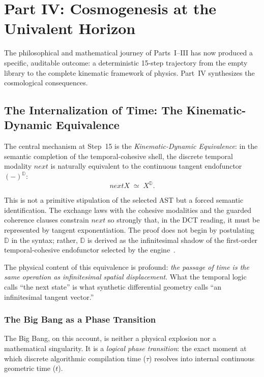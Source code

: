 \documentclass[11pt,a4paper]{article}
\def\bigcirc{next}%
\theoremstyle{plain}
\theoremstyle{definition}
\theoremstyle{remark}
\newcommand{\D}{\mathbb{D}}
\begin{document}
\section{Part IV: Cosmogenesis at the Univalent Horizon}
\label{sec:partIV}

The philosophical and mathematical journey of Parts~I--III has now produced a specific, auditable outcome: a deterministic 15-step trajectory from the empty library to the complete kinematic framework of physics.  Part~IV synthesizes the cosmological consequences.


\subsection{The Internalization of Time: The Kinematic-Dynamic Equivalence}
\label{sec:kde}

The central mechanism at Step~15 is the \emph{Kinematic-Dynamic Equivalence}: in the semantic completion of the temporal-cohesive shell, the discrete temporal modality $\bigcirc$ is naturally equivalent to the continuous tangent endofunctor $(-)^{\D}$:
\begin{equation}
\label{eq:kde}
\bigcirc X \;\simeq\; X^{\D}.
\end{equation}

This is not a primitive stipulation of the selected AST but a forced semantic identification.  The exchange laws with the cohesive modalities and the guarded coherence clauses constrain $\bigcirc$ so strongly that, in the DCT reading, it must be represented by tangent exponentiation.  The proof does not begin by postulating $\D$ in the syntax; rather, $\D$ is derived as the infinitesimal shadow of the first-order temporal-cohesive endofunctor selected by the engine~\cite{pen2026}.

The physical content of this equivalence is profound: \emph{the passage of time is the same operation as infinitesimal spatial displacement}.  What the temporal logic calls ``the next state'' is what synthetic differential geometry calls ``an infinitesimal tangent vector.''


\subsubsection{The Big Bang as a Phase Transition}

The Big Bang, on this account, is neither a physical explosion nor a mathematical singularity.  It is a \emph{logical phase transition}: the exact moment at which discrete algorithmic compilation time ($\tau$) resolves into internal continuous geometric time ($t$).
\end{document}
